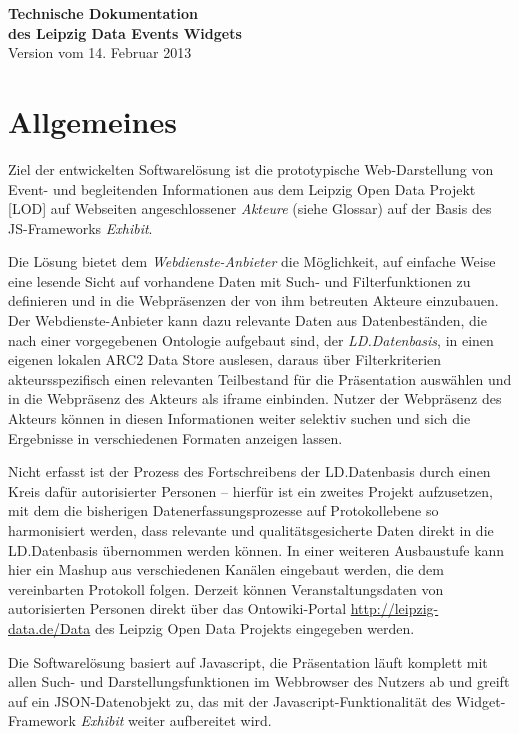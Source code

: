 \documentclass[11pt,a4paper]{article}
\begin{document}
\begin{center}
  \textbf{\Large Technische Dokumentation\\[.3em] des Leipzig Data Events
    Widgets}\\[1em] Version vom 14. Februar 2013
\end{center}

\section{Allgemeines}
Ziel der entwickelten Softwarelösung ist die prototypische Web-Darstellung von
Event- und begleitenden Informationen aus dem Leipzig Open Data Projekt [LOD]
auf Webseiten angeschlossener \emph{Akteure} (siehe Glossar) auf der Basis des
JS-Frameworks \emph{Exhibit}.

Die Lösung bietet dem \emph{Webdienste-Anbieter} die Möglichkeit, auf einfache
Weise eine lesende Sicht auf vorhandene Daten mit Such- und Filterfunktionen
zu definieren und in die Webpräsenzen der von ihm betreuten Akteure
einzubauen.  Der Webdienste-Anbieter kann dazu relevante Daten aus
Datenbeständen, die nach einer vorgegebenen Ontologie aufgebaut sind, der
\emph{LD.Datenbasis}, in einen eigenen lokalen ARC2 Data Store auslesen,
daraus über Filterkriterien akteursspezifisch einen relevanten Teilbestand für
die Präsentation auswählen und in die Webpräsenz des Akteurs als iframe
einbinden.  Nutzer der Webpräsenz des Akteurs können in diesen Informationen
weiter selektiv suchen und sich die Ergebnisse in verschiedenen Formaten
anzeigen lassen.

Nicht erfasst ist der Prozess des Fortschreibens der LD.Datenbasis durch einen
Kreis dafür autorisierter Personen -- hierfür ist ein zweites Projekt
aufzusetzen, mit dem die bisherigen Datenerfassungsprozesse auf Protokollebene
so harmonisiert werden, dass relevante und qualitätsgesicherte Daten direkt in
die LD.Datenbasis übernommen werden können. In einer weiteren Ausbaustufe kann
hier ein Mashup aus verschiedenen Kanälen eingebaut werden, die dem
vereinbarten Protokoll folgen.  Derzeit können Veranstaltungsdaten von
autorisierten Personen direkt über das Ontowiki-Portal
\url{http://leipzig-data.de/Data} des Leipzig Open Data Projekts eingegeben
werden.

Die Softwarelösung basiert auf Javascript, die Präsentation läuft komplett mit
allen Such- und Darstellungsfunktionen im Webbrowser des Nutzers ab und greift
auf ein JSON-Datenobjekt zu, das mit der Javascript-Funktionalität des
Widget-Framework \emph{Exhibit} weiter aufbereitet wird.
\end{document}
